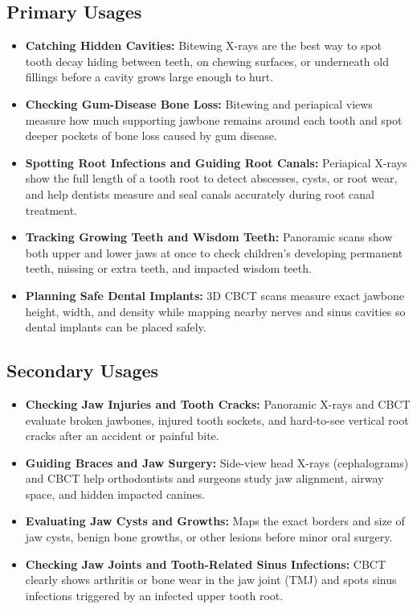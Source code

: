 \subsection{Primary Usages}
\begin{itemize}
\item \textbf{Catching Hidden Cavities:} Bitewing X-rays are the best way to spot tooth decay hiding between teeth, on chewing surfaces, or underneath old fillings before a cavity grows large enough to hurt.
\item \textbf{Checking Gum-Disease Bone Loss:} Bitewing and periapical views measure how much supporting jawbone remains around each tooth and spot deeper pockets of bone loss caused by gum disease.
\item \textbf{Spotting Root Infections and Guiding Root Canals:} Periapical X-rays show the full length of a tooth root to detect abscesses, cysts, or root wear, and help dentists measure and seal canals accurately during root canal treatment.
\item \textbf{Tracking Growing Teeth and Wisdom Teeth:} Panoramic scans show both upper and lower jaws at once to check children's developing permanent teeth, missing or extra teeth, and impacted wisdom teeth.
\item \textbf{Planning Safe Dental Implants:} 3D CBCT scans measure exact jawbone height, width, and density while mapping nearby nerves and sinus cavities so dental implants can be placed safely.
\end{itemize}

\subsection{Secondary Usages}
\begin{itemize}
\item \textbf{Checking Jaw Injuries and Tooth Cracks:} Panoramic X-rays and CBCT evaluate broken jawbones, injured tooth sockets, and hard-to-see vertical root cracks after an accident or painful bite.
\item \textbf{Guiding Braces and Jaw Surgery:} Side-view head X-rays (cephalograms) and CBCT help orthodontists and surgeons study jaw alignment, airway space, and hidden impacted canines.
\item \textbf{Evaluating Jaw Cysts and Growths:} Maps the exact borders and size of jaw cysts, benign bone growths, or other lesions before minor oral surgery.
\item \textbf{Checking Jaw Joints and Tooth-Related Sinus Infections:} CBCT clearly shows arthritis or bone wear in the jaw joint (TMJ) and spots sinus infections triggered by an infected upper tooth root.
\end{itemize}

